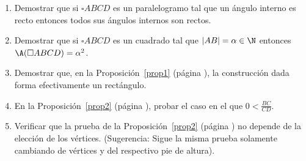 \begin{enumerate}

\item Demostrar que si  $\square ABCD$ es un paralelogramo tal que un ángulo interno es recto entonces todos sus ángulos internos son rectos.

\item  Demostrar que si $\square ABCD$ es un cuadrado tal que $|AB|=\alpha \in \N$ entonces $\A(\square ABCD)=\alpha^{2}$.

\item Demostrar que, en la Proposición~\ref{prop1} (página \pageref{prop1}), la construcción dada forma efectivamente un rectángulo.\label{rectángulo}

\item En la Proposición~\ref{prop2} (página \pageref{prop2}), probar el  caso en el que $0<\frac{BC}{CD}$.\label{cortafuera}

\item Verificar que la prueba de la Proposición~\ref{prop2} (página \pageref{prop2}) no depende de la elección de los vértices. (Sugerencia: Sigue la misma prueba solamente cambiando de vértices y del respectivo pie de altura).\label{area}
\end{enumerate}


